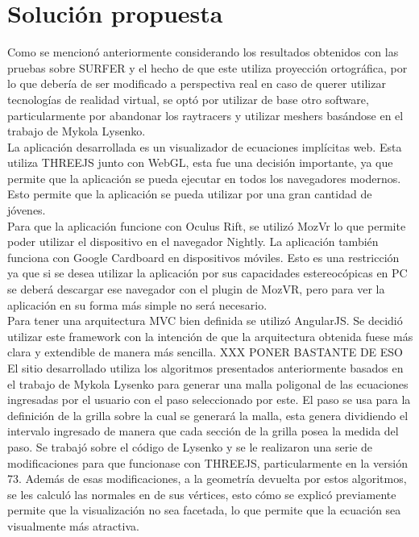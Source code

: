 \documentclass[12pt]{article}
\begin{document}
\section{Solución propuesta}
Como se mencionó anteriormente considerando los resultados obtenidos con las pruebas sobre SURFER  y el hecho de que este utiliza proyección ortográfica, por lo que debería de ser modificado a perspectiva real en caso de querer utilizar tecnologías de realidad virtual, se optó por utilizar de base otro software, particularmente por abandonar los raytracers y utilizar meshers basándose en el trabajo de Mykola Lysenko.
\\La aplicación desarrollada es un visualizador de ecuaciones implícitas web. Esta utiliza THREEJS junto con WebGL, esta fue una decisión importante, ya que permite que la aplicación se pueda ejecutar en todos los navegadores modernos. Esto permite que la aplicación se pueda utilizar por una gran cantidad de jóvenes.
\\Para que la aplicación funcione con Oculus Rift, se utilizó MozVr lo que permite poder utilizar el dispositivo en el navegador Nightly. La aplicación también funciona con Google Cardboard en dispositivos móviles. Esto es una restricción ya que si se desea utilizar la aplicación por sus capacidades estereocópicas en PC se deberá descargar ese navegador con el plugin de MozVR, pero para ver la aplicación en su forma más simple no será necesario.
\\ Para tener una arquitectura MVC bien definida se utilizó AngularJS. Se decidió utilizar este framework con la intención de que la arquitectura obtenida fuese más clara y extendible de manera más sencilla.  XXX PONER BASTANTE DE ESO
\\El sitio desarrollado utiliza los algoritmos presentados anteriormente basados en el trabajo de Mykola Lysenko\cite{mykola1}\cite{mykola2} para generar una malla poligonal de las ecuaciones ingresadas por el usuario con el paso seleccionado por este. El paso se usa para la definición de la grilla sobre la cual se generará la malla, esta genera dividiendo el intervalo ingresado de manera que cada sección de la grilla posea la medida del paso. Se trabajó sobre el código de Lysenko y se le realizaron una serie de modificaciones para que funcionase con THREEJS, particularmente en la versión 73. Además de esas modificaciones, a la geometría devuelta por estos algoritmos, se les calculó las normales en de sus vértices, esto cómo se explicó previamente permite que la visualización no sea facetada, lo que permite que la ecuación sea visualmente más atractiva. 
\end{document}
